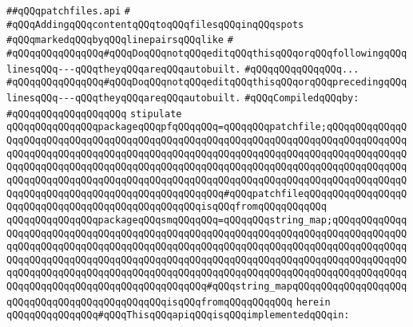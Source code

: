 \label{src/lib/make-library-glue/patchfiles.api}
\verb|##qQQqpatchfiles.api|\newline
\verb|#|\newline
\verb|#qQQqAddingqQQqcontentqQQqtoqQQqfilesqQQqinqQQqspots|\newline
\verb|#qQQqmarkedqQQqbyqQQqlinepairsqQQqlike|\newline
\verb|#|\newline
\verb|#qQQqqQQqqQQqqQQq#qQQqDoqQQqnotqQQqeditqQQqthisqQQqorqQQqfollowingqQQqlinesqQQq---qQQqtheyqQQqareqQQqautobuilt.|\newline
\verb|#qQQqqQQqqQQqqQQq...|\newline
\verb|#qQQqqQQqqQQqqQQq#qQQqDoqQQqnotqQQqeditqQQqthisqQQqorqQQqprecedingqQQqlinesqQQq---qQQqtheyqQQqareqQQqautobuilt.|\newline
\newline
\verb|#qQQqCompiledqQQqby:|\newline
\verb|#qQQqqQQqqQQqqQQqqQQq|\newline
\newline
\verb|stipulate|\newline
\verb|qQQqqQQqqQQqqQQqpackageqQQqpfqQQqqQQq=qQQqqQQqpatchfile;qQQqqQQqqQQqqQQqqQQqqQQqqQQqqQQqqQQqqQQqqQQqqQQqqQQqqQQqqQQqqQQqqQQqqQQqqQQqqQQqqQQqqQQqqQQqqQQqqQQqqQQqqQQqqQQqqQQqqQQqqQQqqQQqqQQqqQQqqQQqqQQqqQQqqQQqqQQqqQQqqQQqqQQqqQQqqQQqqQQqqQQqqQQqqQQqqQQqqQQqqQQqqQQqqQQqqQQqqQQqqQQqqQQqqQQqqQQqqQQqqQQqqQQqqQQqqQQqqQQqqQQqqQQqqQQqqQQqqQQqqQQqqQQqqQQqqQQqqQQqqQQqqQQqqQQqqQQqqQQqqQQqqQQqqQQq#qQQqpatchfileqQQqqQQqqQQqqQQqqQQqqQQqqQQqqQQqqQQqqQQqqQQqqQQqqQQqisqQQqfromqQQqqQQqqQQq|\newline
\verb|qQQqqQQqqQQqqQQqpackageqQQqsmqQQqqQQq=qQQqqQQqstring_map;qQQqqQQqqQQqqQQqqQQqqQQqqQQqqQQqqQQqqQQqqQQqqQQqqQQqqQQqqQQqqQQqqQQqqQQqqQQqqQQqqQQqqQQqqQQqqQQqqQQqqQQqqQQqqQQqqQQqqQQqqQQqqQQqqQQqqQQqqQQqqQQqqQQqqQQqqQQqqQQqqQQqqQQqqQQqqQQqqQQqqQQqqQQqqQQqqQQqqQQqqQQqqQQqqQQqqQQqqQQqqQQqqQQqqQQqqQQqqQQqqQQqqQQqqQQqqQQqqQQqqQQqqQQqqQQqqQQqqQQqqQQqqQQqqQQqqQQqqQQqqQQqqQQqqQQqqQQqqQQqqQQqqQQq#qQQqstring_mapqQQqqQQqqQQqqQQqqQQqqQQqqQQqqQQqqQQqqQQqqQQqqQQqisqQQqfromqQQqqQQqqQQq|\newline
\verb|herein|\newline
\newline
\verb|qQQqqQQqqQQqqQQq#qQQqThisqQQqapiqQQqisqQQqimplementedqQQqin:|\newline

